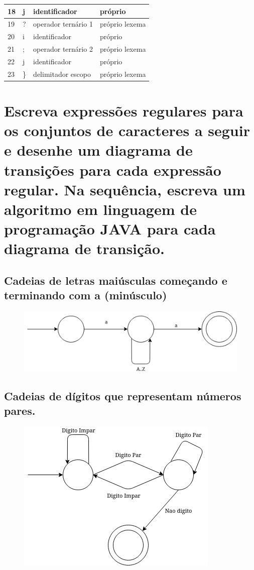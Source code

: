 \documentclass{article}
\begin{document}
\begin{center}
\begin{tabular}{||p{0.7cm} p{3cm} p{3cm} p{3cm}||}
     \hline
     18 & j & identificador & próprio \\
     \hline
     19 & ? & operador ternário 1 & próprio lexema \\
     \hline
     20 & i & identificador & próprio \\
     \hline
     21 & ; & operador ternário 2 & próprio lexema \\
     \hline
     22 & j & identificador & próprio \\
     \hline
     23 & \} & delimitador escopo & próprio lexema \\
     \hline
  \end{tabular}
\end{center}

\section{Escreva expressões regulares para os conjuntos de caracteres a seguir e desenhe um diagrama de transições para cada expressão regular. Na sequência, escreva um algoritmo em linguagem de programação JAVA para cada diagrama de transição.}

\subsection{Cadeias de letras maiúsculas começando e terminando com a (minúsculo)}

\begin{figure}[h]
  \centering
    \includegraphics[scale=0.5]{./imgs/first.png}
\end{figure}

\subsection{Cadeias de dígitos que representam números pares.}

\begin{figure}[h]
  \centering
    \includegraphics[scale=0.5]{./imgs/second.png}
\end{figure}
\end{document}
